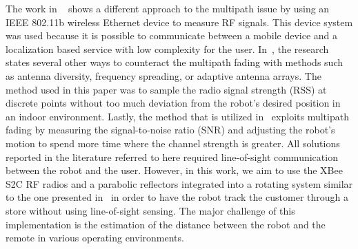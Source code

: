 \documentclass[conference]{IEEEtran}
\begin{document}
The work in ~\cite{ladd_bekris_rudys_kavraki_wallach_2005} shows a different
approach to the multipath issue by using an IEEE 802.11b wireless Ethernet
device to measure RF signals. This device system was used because it is possible to communicate between a mobile device and a localization based service with low
complexity for the user. In~\cite{lindhe_johansson_bicchi_2007}, the research
states several other ways to counteract the multipath fading with methods such
as antenna diversity, frequency spreading, or adaptive antenna arrays. The
method used in this paper was to sample the radio signal strength (RSS) at
discrete points without too much deviation from the robot's desired position in
an indoor environment. Lastly, the method that is utilized in~\cite{Lindhe2009}
exploits multipath fading by measuring the signal-to-noise ratio (SNR) and
adjusting the robot's motion to spend more time where the channel strength is
greater. All solutions reported in the literature referred to here required line-of-sight
communication between the robot and the user. However, in this work, we aim to use the
XBee S2C RF radios and a parabolic reflectors integrated into a rotating system
similar to the one presented in~\cite{Miah2018-Intelligent} in order to have the
robot track the customer through a store without using line-of-sight sensing.
The major challenge of this implementation is the estimation of the distance
between the robot and the remote in various operating environments.
\end{document}
